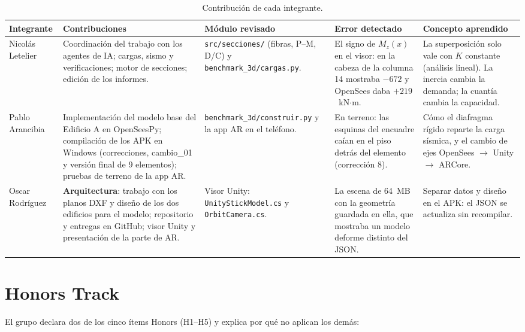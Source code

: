 \documentclass[11pt,a4paper]{article}
\begin{document}
\begin{table}[H]
\centering
\caption{Contribución de cada integrante.}
\small
\begin{tabularx}{\textwidth}{p{2.4cm}XXXX}
\toprule
Integrante & Contribuciones & Módulo revisado & Error detectado & Concepto aprendido \\
\midrule
Nicolás Letelier &
Coordinación del trabajo con los agentes de IA;
cargas, sismo y verificaciones; motor de secciones; edición de los informes. &
\texttt{src/secciones/} (fibras, P--M, D/C) y \texttt{benchmark\_3d/cargas.py}. &
El signo de $M_z(x)$ en el visor: en la cabeza de la columna 14 mostraba $-672$
y OpenSees daba $+219$~kN$\cdot$m. &
La superposición solo vale con $K$ constante (análisis lineal). La inercia
cambia la demanda; la cuantía cambia la capacidad. \\
\midrule
Pablo Arancibia &
Implementación del modelo base del Edificio A en OpenSeesPy; compilación
de los APK en Windows (correcciones, cambio\_01 y versión final de 9
elementos); pruebas de terreno de la app AR. &
\texttt{benchmark\_3d/construir.py} y la app AR en el teléfono. &
En terreno: las esquinas del encuadre caían en el piso detrás del elemento
(corrección 8). &
Cómo el diafragma rígido reparte la carga sísmica, y el cambio de ejes
OpenSees $\to$ Unity $\to$ ARCore. \\
\midrule
Oscar Rodríguez &
\textbf{Arquitectura}: trabajo con los planos DXF y diseño de los dos
edificios para el modelo; repositorio y entregas en GitHub; visor Unity y
presentación de la parte de AR. &
Visor Unity: \texttt{Unity\-Stick\-Model.cs} y \texttt{OrbitCamera.cs}. &
La escena de 64~MB con la geometría guardada en ella, que mostraba un modelo
deforme distinto del JSON. &
Separar datos y diseño en el APK: el JSON se actualiza sin recompilar. \\
\bottomrule
\end{tabularx}
\end{table}

\section{Honors Track}

El grupo declara dos de los cinco ítems Honors (H1--H5) y explica por qué no
aplican los demás:
\end{document}
